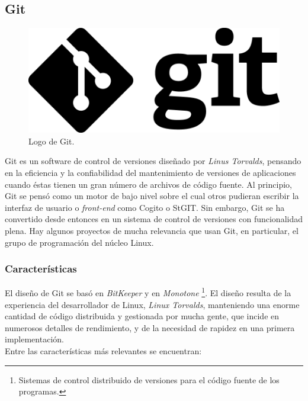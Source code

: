 \subsection{Git}

\begin{figure}[htbp]
    \centering
    	\includegraphics[scale=0.5]{./Figuras/gitlogo.png}
    \caption{Logo de Git.}
    \label{fig:git}
\end{figure}

Git es un software de control de versiones dise\~nado por \textit{Linus Torvalds}, pensando en la eficiencia y la confiabilidad del mantenimiento de versiones de aplicaciones cuando \'estas tienen un gran n\'umero de archivos de c\'odigo fuente. Al principio, Git se pens\'o como un motor de bajo nivel sobre el cual otros pudieran escribir la interfaz de usuario o \textit{front-end} como Cogito o StGIT. Sin embargo, Git se ha convertido desde entonces en un sistema de control de versiones con funcionalidad plena. Hay algunos proyectos de mucha relevancia que usan Git, en particular, el grupo de programaci\'on del n\'ucleo Linux.\\

\subsubsection{Caracter\'isticas}

El dise\~no de Git se bas\'o en \textit{BitKeeper} y en \textit{Monotone} \footnote[2]{Sistemas de control distribuido de versiones para el c\'odigo fuente de los programas.}. El dise\~no resulta de la experiencia del desarrollador de Linux, \textit{Linux Torvalds}, manteniendo una enorme cantidad de c\'odigo distribuida y gestionada por mucha gente, que incide en numerosos detalles de rendimiento, y de la necesidad de rapidez en una primera implementaci\'on.\\

Entre las caracter\'isticas m\'as relevantes se encuentran:

